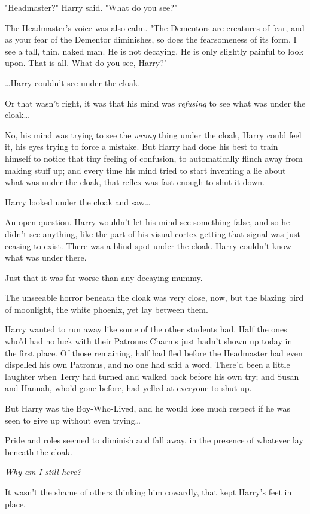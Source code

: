 "Headmaster?" Harry said. "What do you see?"

The Headmaster's voice was also calm. "The Dementors are creatures of fear, and
as your fear of the Dementor diminishes, so does the fearsomeness of its form.
I see a tall, thin, naked man. He is not decaying. He is only slightly painful
to look upon. That is all. What do you see, Harry?"

…Harry couldn't see under the cloak.

Or that wasn't right, it was that his mind was \emph{refusing} to see what was
under the cloak…

No, his mind was trying to see the \emph{wrong} thing under the cloak, Harry
could feel it, his eyes trying to force a mistake. But Harry had done his best
to train himself to notice that tiny feeling of confusion, to automatically
flinch away from making stuff up; and every time his mind tried to start
inventing a lie about what was under the cloak, that reflex was fast enough to
shut it down.

Harry looked under the cloak and saw…

An open question. Harry wouldn't let his mind see something false, and so he
didn't see anything, like the part of his visual cortex getting that signal was
just ceasing to exist. There was a blind spot under the cloak. Harry couldn't
know what was under there.

Just that it was far worse than any decaying mummy.

The unseeable horror beneath the cloak was very close, now, but the blazing
bird of moonlight, the white phoenix, yet lay between them.

Harry wanted to run away like some of the other students had. Half the ones
who'd had no luck with their Patronus Charms just hadn't shown up today in the
first place. Of those remaining, half had fled before the Headmaster had even
dispelled his own Patronus, and no one had said a word. There'd been a little
laughter when Terry had turned and walked back before his own try; and Susan
and Hannah, who'd gone before, had yelled at everyone to shut up.

But Harry was the Boy-Who-Lived, and he would lose much respect if he was seen
to give up without even trying…

Pride and roles seemed to diminish and fall away, in the presence of whatever
lay beneath the cloak.

\emph{Why am I still here?}

It wasn't the shame of others thinking him cowardly, that kept Harry's feet in
place.


